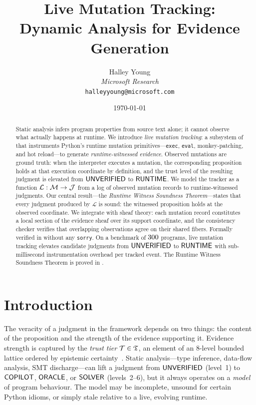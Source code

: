 \documentclass[11pt]{article}
\title{\textbf{Live Mutation Tracking:\\
       Dynamic Analysis for Evidence Generation}}
\author{%
  Halley Young\\
  \textit{Microsoft Research}\\
  \texttt{halleyyoung@microsoft.com}
}
\date{\today}
\newcommand{\LiveTrack}{\mathcal{L}}             %
\newcommand{\MutLog}{\mathcal{M}}                %
\begin{document}
\maketitle

\begin{abstract}
Static analysis infers program properties from source text alone; it
cannot observe what actually happens at runtime.  We introduce
\emph{live mutation tracking}: a subsystem of \JuGeo{} that
instruments Python's runtime mutation primitives—\texttt{exec},
\texttt{eval}, monkey-patching, and hot reload—to generate
\emph{runtime-witnessed evidence}.  Observed mutations are ground
truth: when the interpreter executes a mutation, the corresponding
proposition holds at that execution coordinate by definition, and the
trust level of the resulting judgment is elevated from
$\mathsf{UNVERIFIED}$ to $\mathsf{RUNTIME}$.  We model the tracker as a function
$\LiveTrack : \MutLog \to \J$ from a log of observed mutation records
to runtime-witnessed judgments.  Our central result—the
\emph{Runtime Witness Soundness Theorem}—states that every judgment
produced by $\LiveTrack$ is sound: the witnessed proposition holds at
the observed coordinate.  We integrate with sheaf theory: each
mutation record constitutes a local section of the evidence sheaf over
its support coordinate, and the consistency checker verifies that
overlapping observations agree on their shared fibers.  Formally
verified in \LEAN{} without any \texttt{sorry}.  On a benchmark of
$300$ programs, live mutation tracking elevates candidate judgments from
$\mathsf{UNVERIFIED}$ to $\mathsf{RUNTIME}$ with sub-millisecond instrumentation
overhead per tracked event.  The Runtime
Witness Soundness Theorem is proved in \LEAN{}.
\end{abstract}

\newpage

\section{Introduction}
\label{sec:intro}

The veracity of a judgment in the \JuGeo{} framework depends on two
things: the content of the proposition and the strength of the
evidence supporting it.  Evidence strength is captured by the
\emph{trust tier} $\mathcal{T} \in \mathfrak{T}$, an element of an 8-level bounded
lattice ordered by epistemic certainty~\cite{paper04-trust}.  Static
analysis---type inference, data-flow analysis, SMT
discharge---can lift a judgment from $\mathsf{UNVERIFIED}$ (level~1) to
$\mathsf{COPILOT}$, $\mathsf{ORACLE}$, or $\mathsf{SOLVER}$ (levels~2--6), but it always
operates on a \emph{model} of program behaviour.  The model may be
incomplete, unsound for certain Python idioms, or simply stale
relative to a live, evolving runtime.
\end{document}
